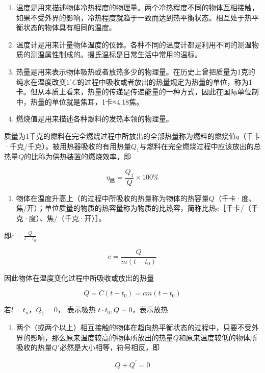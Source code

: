 \begin{enumerate}
\def\labelenumi{\arabic{enumi}.}
\item
  温度是用来描述物体冷热程度的物理量。两个冷热程度不同的物体互相接触，如果不受外界的影响，冷热程度就趋于一致而达到热平衡状态。相互处于热平衡状态的物体具有相同的温度。
\item
  温度计是用来计量物体温度的仪器。各种不同的温度计都是利用不同的测温物质的测温属性制成的。摄氏温标是日常生活中常用的温标。
\item
  热量是用来表示物体吸热或者放热多少的物理量。在历史上曾把质量为1克的纯水在温度改变\(1^{\circ}C\)的过程中吸收或者放出的热量规定为热量的单位，称为1卡。但从本质上看来，热量的传递是传递能量的一种方式，因此在国际单位制中，热量的单位就是焦耳，1卡≈4.18焦。
\item
  燃烧值是用来描述各种燃料的发热本领的物理量。
\end{enumerate}

质量为1千克的燃料在完全燃烧过程中所放出的全部热量称为燃料的燃烧值\(q\)（千卡·千克/千克）。被用热器吸收的有用热量\(Q_{1}\)与燃料在完全燃烧过程中应该放出的总热量\(Q\)的比称为供热装置的燃烧效率，即

\[
\eta_{\text{燃}}=\frac{Q_1}{Q}\times100\%
\]

\begin{enumerate}
\def\labelenumi{\arabic{enumi}.}
\setcounter{enumi}{4}
\tightlist
\item
  物体在温度升高上（的过程中所吸收的热量称为物体的热容量\(Q\)（千卡·度、焦/开）；单位质量的物质的热容量称为物质的比热容，简称比热\(c\)［千卡/（千克·度）、焦/（千克·开）］。
\end{enumerate}

即\(c = \frac{Q}{t - t_0}\)

\[
c=\frac{Q}{m(t-t_0)}
\]

因此物体在温度变化过程中所吸收或放出的热量

\[
Q=C(t-t_0)=cm(t-t_0)
\]

若\(l = t_{n}\)，\(Q_{1} = 0\)， 表示吸热
\(t \cdot t_{0}, Q \sim 0\)，表示放热

\begin{enumerate}
\def\labelenumi{\arabic{enumi}.}
\setcounter{enumi}{5}
\tightlist
\item
  两个（或两个以上）相互接触的物体在趋向热平衡状态的过程中，只要不受外界的影响，那么原来温度较高的物体所放出的热量\(Q\)和原来温度较低的物体所吸收的热量\(Q'\)必然是大小相等，符号相反，即
\end{enumerate}

\[
Q + Q ^ {\prime} = 0
\]

